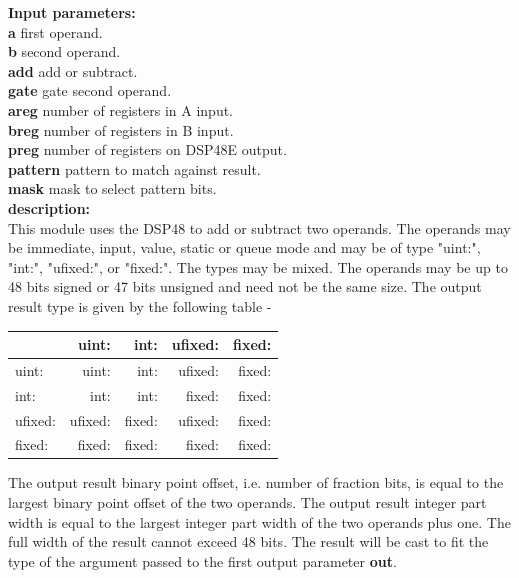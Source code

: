            {\bf Input parameters:} \\
            {\bf a} first operand.\\
            {\bf b} second operand.\\
            {\bf add} add or subtract.\\
            {\bf gate} gate second operand.\\
            {\bf areg} number of registers in A input.\\
            {\bf breg} number of registers in B input.\\
            {\bf preg} number of registers on DSP48E output.\\
            {\bf pattern} pattern to match against result.\\
            {\bf mask} mask to select pattern bits.\\

            {\bf description:} \\
            This module uses the DSP48 to add or subtract two operands. The
            operands may be immediate, input, value, static or queue mode and may
            be of type "uint:", "int:", "ufixed:", or "fixed:". The types may be
            mixed. The operands may be up to 48 bits signed or 47 bits unsigned
            and need not be the same size. The output result type is given by
            the following table -

            \begin{tabular}{| l || r | r | r | r |}
            \hline
                    & uint:   & int:   & ufixed: & fixed: \\
            \hline
            \hline
            uint:   & uint:   & int:   & ufixed: & fixed: \\
            \hline
            int:    & int:    & int:   & fixed:  & fixed: \\
            \hline
            ufixed: & ufixed: & fixed: & ufixed: & fixed: \\
            \hline
            fixed:  & fixed:  & fixed: & fixed:  & fixed: \\
            \hline
            \end{tabular}

            The output result binary point offset, i.e. number of fraction
            bits, is equal to the largest binary point offset of the two
            operands. The output result integer part width is equal to the
            largest integer part width of the two operands plus one. The
            full width of the result cannot exceed 48 bits. The result will
            be cast to fit the type of the argument passed to the first
            output parameter {\bf out}.

